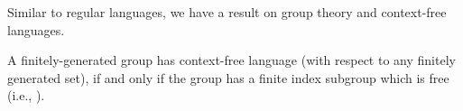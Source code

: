 \small

Similar to regular languages, we have a result on group theory and context-free languages.

\begin{theorem}
    A finitely-generated group has context-free language (with respect to any finitely generated set), if and only if the group has a finite index subgroup which is free (i.e., ).
\end{theorem}

\normalsize